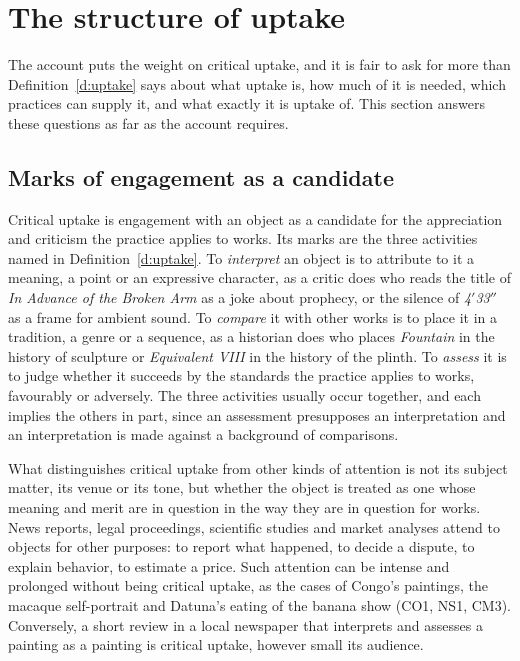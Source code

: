 \documentclass{situationist-preprint}
\begin{document}
\section{The structure of uptake}\label{s:structure}

The account puts the weight on critical uptake, and it is fair to ask for more than Definition~\ref{d:uptake} says about what uptake is, how much of it is needed, which practices can supply it, and what exactly it is uptake of. This section answers these questions as far as the account requires.

\subsection{Marks of engagement as a candidate}

Critical uptake is engagement with an object as a candidate for the appreciation and criticism the practice applies to works. Its marks are the three activities named in Definition~\ref{d:uptake}. To \emph{interpret} an object is to attribute to it a meaning, a point or an expressive character, as a critic does who reads the title of \emph{In Advance of the Broken Arm} as a joke about prophecy, or the silence of \emph{4$'$33$''$} as a frame for ambient sound. To \emph{compare} it with other works is to place it in a tradition, a genre or a sequence, as a historian does who places \emph{Fountain} in the history of sculpture or \emph{Equivalent VIII} in the history of the plinth. To \emph{assess} it is to judge whether it succeeds by the standards the practice applies to works, favourably or adversely. The three activities usually occur together, and each implies the others in part, since an assessment presupposes an interpretation and an interpretation is made against a background of comparisons.

What distinguishes critical uptake from other kinds of attention is not its subject matter, its venue or its tone, but whether the object is treated as one whose meaning and merit are in question in the way they are in question for works. News reports, legal proceedings, scientific studies and market analyses attend to objects for other purposes: to report what happened, to decide a dispute, to explain behavior, to estimate a price. Such attention can be intense and prolonged without being critical uptake, as the cases of Congo's paintings, the macaque self-portrait and Datuna's eating of the banana show (CO1, NS1, CM3). Conversely, a short review in a local newspaper that interprets and assesses a painting as a painting is critical uptake, however small its audience.
\end{document}
